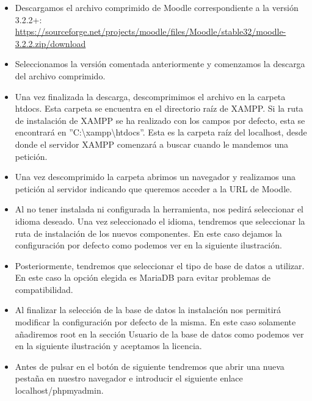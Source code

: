 \begin{itemize}

	\item Descargamos el archivo comprimido de Moodle correspondiente a la versión 3.2.2+: \url{https://sourceforge.net/projects/moodle/files/Moodle/stable32/moodle-3.2.2.zip/download}
	
	\item Seleccionamos la versión comentada anteriormente y comenzamos la descarga del archivo comprimido. 
	
	\item Una vez finalizada la descarga, descomprimimos el archivo en la carpeta htdocs. Esta carpeta se encuentra en el directorio raíz de XAMPP. Si la ruta de instalación de XAMPP se ha realizado con los campos por defecto, esta se encontrará en ''C:\textbackslash{xampp}\textbackslash{htdocs}''. Esta es la carpeta raíz del localhost, desde donde el servidor XAMPP comenzará a buscar cuando le mandemos una petición.
	
	\item Una vez descomprimido la carpeta abrimos un navegador y realizamos una petición al servidor indicando que queremos acceder a la URL de Moodle. 
	
	\item Al no tener instalada ni configurada la herramienta, nos pedirá seleccionar el idioma deseado. Una vez seleccionado el idioma, tendremos que seleccionar la ruta de instalación de los nuevos componentes. En este caso dejamos la configuración por defecto como podemos ver en la siguiente ilustración. 
	
	\item Posteriormente, tendremos que seleccionar el tipo de base de datos a utilizar. En este caso la opción elegida es MariaDB para evitar problemas de compatibilidad. 
	
	\item Al finalizar la selección de la base de datos la instalación nos permitirá modificar la configuración por defecto de la misma. En este caso solamente añadiremos root en la sección Usuario de la base de datos como podemos ver en la siguiente ilustración y aceptamos la licencia. 
	
	\item Antes de pulsar en el botón de siguiente tendremos que abrir una nueva pestaña en nuestro navegador e introducir el siguiente enlace localhost/phpmyadmin. 
	

\end{itemize}
